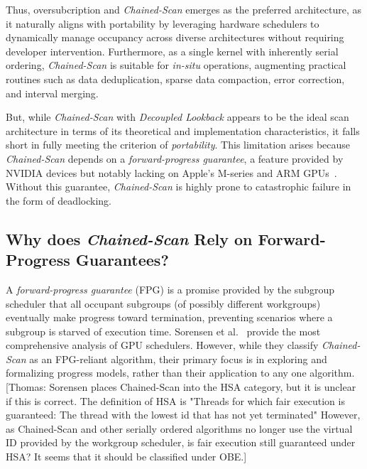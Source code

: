 \documentclass[sigconf]{acmart}
\newcommand{\thomas}[1]{{\footnotesize\color{orange}[Thomas: #1]}}
\begin{document}
Thus, oversubcription and \emph{Chained-Scan} emerges as the preferred architecture, as it naturally aligns with portability by leveraging hardware schedulers to dynamically manage occupancy across diverse architectures without requiring developer intervention. Furthermore, as a single kernel with inherently serial ordering, \emph{Chained-Scan} is suitable for \emph{in-situ} operations, augmenting practical routines such as data deduplication, sparse data compaction, error correction, and interval merging.

But, while \emph{Chained-Scan} with \emph{Decoupled Lookback} appears to be the ideal scan architecture in terms of its theoretical and implementation characteristics, it falls short in fully meeting the criterion of \emph{portability}. This limitation arises because \emph{Chained-Scan} depends on a \emph{forward-progress guarantee}, a feature provided by NVIDIA devices but notably lacking on Apple's M-series and ARM GPUs~\cite{sorensen2021}. Without this guarantee, \emph{Chained-Scan} is highly prone to catastrophic failure in the form of deadlocking.

\subsection{Why does \emph{Chained-Scan} Rely on Forward-Progress Guarantees?}
A \emph{forward-progress guarantee} (FPG) is a promise provided by the subgroup scheduler that all occupant subgroups (of possibly different workgroups) eventually make progress toward termination, preventing scenarios where a subgroup is starved of execution time. Sorensen et al.~\cite{sorensen2018,sorensen2021} provide the most comprehensive analysis of GPU schedulers. However, while they classify \emph{Chained-Scan} as an FPG-reliant algorithm, their primary focus is in exploring and formalizing progress models, rather than their application to any one algorithm.
\thomas{Sorensen places Chained-Scan into the HSA category, but it is unclear if this is correct. The definition of HSA is \newline "Threads for which fair execution is guaranteed: The thread with the lowest id that has not yet terminated" \newline However, as Chained-Scan and other serially ordered algorithms no longer use the virtual ID provided by the workgroup scheduler, is fair execution still guaranteed under HSA? It seems that it should be classified under OBE\@.}
\end{document}

